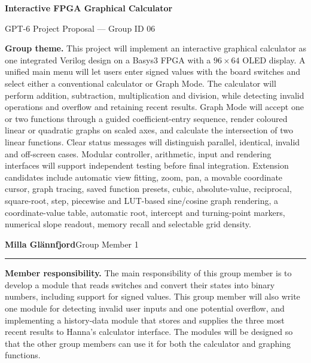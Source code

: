 \documentclass[10pt,a4paper]{article}
\newcommand{\member}[2]{%
  \vspace{2pt}%
  {\bfseries\large #1}\hfill{\small #2}\par
  \vspace{1pt}\hrule\vspace{3pt}%
}
\newcommand{\role}{\textbf{Member responsibility.} }
\begin{document}
\begin{center}
  {\LARGE\bfseries Interactive FPGA Graphical Calculator}\par
  \vspace{2pt}
  {\large GPT-6 Project Proposal --- Group ID 06}
\end{center}

\vspace{-2pt}
\begin{minipage}{\textwidth}
    \textbf{Group theme.}
    This project will implement an interactive graphical calculator as one
    integrated Verilog design on a Basys3 FPGA with a $96\times64$ OLED display.
    A unified main menu will let users enter signed values with the board
    switches and select either a conventional calculator or Graph Mode. The
    calculator will perform addition, subtraction, multiplication and division,
    while detecting invalid operations and overflow and retaining recent
    results. Graph Mode will accept one or two functions through a guided
    coefficient-entry sequence, render coloured linear or quadratic graphs on
    scaled axes, and calculate the intersection of two linear functions. Clear
    status messages will distinguish parallel, identical, invalid and off-screen
    cases. Modular controller, arithmetic, input and rendering interfaces will
    support independent testing before final integration. Extension candidates
    include automatic view fitting,
    zoom, pan, a movable coordinate cursor, graph tracing, saved function
    presets, cubic, absolute-value, reciprocal, square-root, step, piecewise and
    LUT-based sine/cosine graph rendering, a coordinate-value table, automatic
    root, intercept and turning-point markers, numerical slope readout, memory
    recall and selectable grid density.
\end{minipage}

\vspace{5pt}

\member{Milla Gl\"annfjord}{Group Member 1}
\role
The main responsibility of this group member is to develop a module that reads
switches and convert their states into binary numbers, including support for
signed values. This group member will also write one module for detecting
invalid user inputs and one potential overflow, and implementing a history-data
module that stores and supplies the three most recent results to Hanna's
calculator interface. The modules will be designed so that the other group
members can use it for both the calculator and graphing functions.
\end{document}
